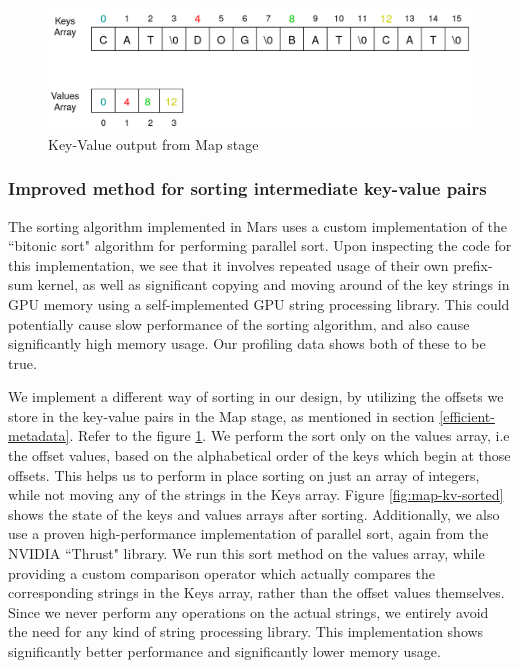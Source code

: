 \documentclass{article}
\begin{document}
\begin{figure}
    \centering
    \includegraphics[width=0.9\linewidth]{images/map-kv-out.png}
    \caption{Key-Value output from Map stage}
    \label{fig:map-kv-out}
\end{figure}

\subsubsection{Improved method for sorting intermediate key-value pairs}
The sorting algorithm implemented in Mars uses a custom implementation of the ``bitonic sort" algorithm for performing parallel sort. Upon inspecting the code for this implementation, we see that it involves repeated usage of their own prefix-sum kernel, as well as significant copying and moving around of the key strings in GPU memory using a self-implemented GPU string processing library.  This could potentially cause slow performance of the sorting algorithm, and also cause significantly high memory usage. Our profiling data shows both of these to be true.

We implement a different way of sorting in our design, by utilizing the offsets we store in the key-value pairs in the Map stage, as mentioned in section \ref{efficient-metadata}. Refer to the figure \ref{fig:map-kv-out}. We perform the sort only on the values array, i.e the offset values, based on the alphabetical order of the keys which begin at those offsets. This helps us to perform in place sorting on just an array of integers, while not moving any of the strings in the Keys array. Figure \ref{fig:map-kv-sorted} shows the state of the keys and values arrays after sorting. Additionally, we also use a proven high-performance implementation of parallel sort, again from the NVIDIA ``Thrust" library.  We run this sort method on the values array, while providing a custom comparison operator which actually compares the corresponding strings in the Keys array, rather than the offset values themselves. Since we never perform any operations on the actual strings, we entirely avoid the need for any kind of string processing library. This implementation shows significantly better performance and significantly lower memory usage.
\end{document}
